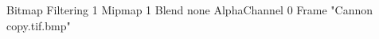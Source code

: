 {Bitmap
	{Filtering 1}
	{Mipmap 1}
	{Blend none}
	{AlphaChannel 0}
	{Frame "Cannon copy.tif.bmp"}
}
